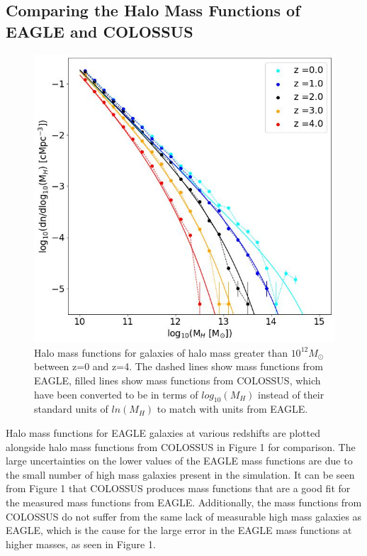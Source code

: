 \documentclass[12pt, twocolumn]{report}%
\begin{document}
\subsection{Comparing the Halo Mass Functions of EAGLE and COLOSSUS}

\begin{figure}[H]
\centering
\includegraphics[width=\linewidth]{Mass_Function.jpeg}
\caption{Halo mass functions for galaxies of halo mass greater than $10^{12}M_\odot$ between z=0 and z=4. The dashed lines show mass functions from EAGLE, filled lines show mass functions from COLOSSUS, which have been converted to be in terms of $log_{10}(M_H)$ instead of their standard units of $ln(M_H)$ to match with units from EAGLE.}
\label{fig:1}
\end{figure}

Halo mass functions for EAGLE galaxies at various redshifts are plotted alongside halo mass functions from COLOSSUS in Figure 1 for comparison. The large uncertainties on the lower values of the EAGLE mass functions are due to the small number of high mass galaxies present in the simulation. It can be seen from Figure 1 that COLOSSUS produces mass functions that are a good fit for the measured mass functions from EAGLE. Additionally, the mass functions from COLOSSUS do not suffer from the same lack of measurable high mass galaxies as EAGLE, which is the cause for the large error in the EAGLE mass functions at higher masses, as seen in Figure 1.\par
\end{document}
